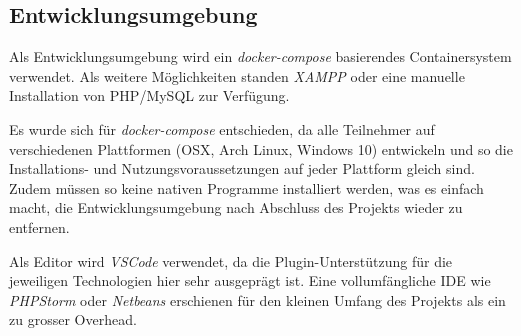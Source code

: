 \subsection{Entwicklungsumgebung}

Als Entwicklungsumgebung wird ein \emph{docker-compose} basierendes Containersystem verwendet. Als weitere Möglichkeiten standen \emph{XAMPP} oder eine manuelle Installation von PHP/MySQL zur Verfügung.

Es wurde sich für \emph{docker-compose} entschieden, da alle Teilnehmer auf verschiedenen Plattformen (OSX, Arch Linux, Windows 10) entwickeln und so die Installations- und Nutzungsvoraussetzungen auf jeder Plattform gleich sind. Zudem müssen so keine nativen Programme installiert werden, was es einfach macht, die Entwicklungsumgebung nach Abschluss des Projekts wieder zu entfernen.

Als Editor wird \emph{VSCode} verwendet, da die Plugin-Unterstützung für die jeweiligen Technologien hier sehr ausgeprägt ist. Eine vollumfängliche IDE wie \emph{PHPStorm} oder \emph{Netbeans} erschienen für den kleinen Umfang des Projekts als ein zu grosser Overhead.
